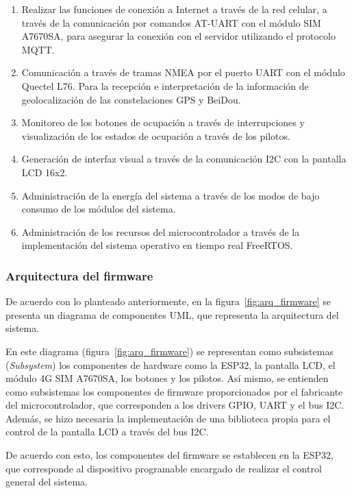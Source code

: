 \begin{enumerate}
 \item Realizar las funciones de conexión a Internet a través de la red celular, a través de la comunicación por comandos AT-UART con el módulo SIM A7670SA, para asegurar la conexión con el servidor utilizando el protocolo MQTT.
 \item Comunicación a través de tramas NMEA por el puerto UART con el módulo Quectel L76. Para la recepción e interpretación de la información de geolocalización de las constelaciones GPS y BeiDou.  
 \item Monitoreo de los botones de ocupación a través de interrupciones y visualización de los estados de ocupación a través de los pilotos. 
 \item Generación de interfaz visual a través de la comunicación I2C con la pantalla LCD 16x2. 
 \item Administración de la energía del sistema a través de los modos de bajo consumo de los módulos del sistema. 
 \item Administración de los recursos del microcontrolador a través de la implementación del sistema operativo en tiempo real FreeRTOS. 
\end{enumerate}

\subsubsection{Arquitectura del firmware}
\label{sec:arquitectura_firmware}

De acuerdo con lo planteado anteriormente, en la figura~\ref{fig:arq_firmware} se presenta un diagrama de componentes UML, que representa la arquitectura del sistema. 

En este diagrama (figura~\ref{fig:arq_firmware}) se representan como subsistemas (\textit{Subsystem}) los componentes de hardware como la ESP32, la pantalla LCD, el módulo 4G SIM A7670SA, los botones y los pilotos. Así mismo, se entienden como subsistemas los componentes de firmware proporcionados por el fabricante del microcontrolador, que corresponden a los drivers GPIO, UART y el bus I2C. Además, se hizo necesaria la implementación de una biblioteca propia para el control de la pantalla LCD a través del bus I2C.

De acuerdo con esto, los componentes del firmware se establecen en la ESP32, que corresponde al dispositivo programable encargado de realizar el control general del sistema. 

